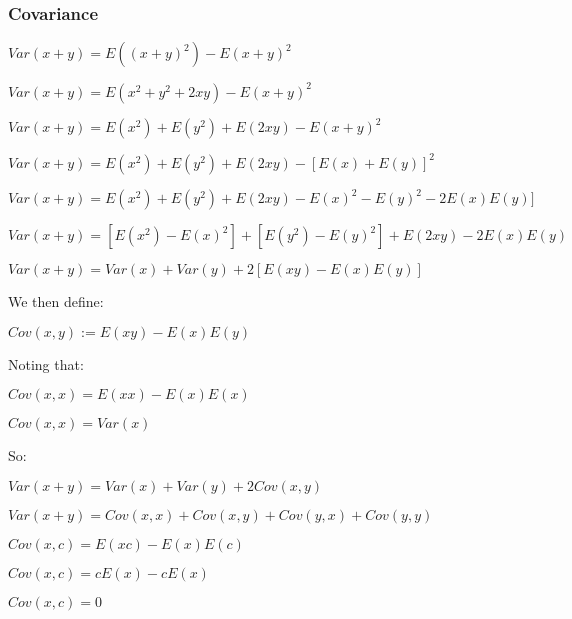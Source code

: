 \subsubsection{Covariance}

\(Var(x+y)=E((x+y)^2)-E(x+y)^2\)

\(Var(x+y)=E(x^2+y^2+2xy)-E(x+y)^2\)

\(Var(x+y)=E(x^2)+E(y^2)+E(2xy)-E(x+y)^2\)

\(Var(x+y)=E(x^2)+E(y^2)+E(2xy)-[E(x)+E(y)]^2\)

\(Var(x+y)=E(x^2)+E(y^2)+E(2xy)-E(x)^2-E(y)^2-2E(x)E(y)]\)

\(Var(x+y)=[E(x^2)-E(x)^2]+[E(y^2)-E(y)^2]+E(2xy)-2E(x)E(y)\)

\(Var(x+y)=Var(x) +Var(y)+2[E(xy)-E(x)E(y)]\)

We then define:

\(Cov(x,y):=E(xy)-E(x)E(y)\)

Noting that:

\(Cov(x,x)=E(xx)-E(x)E(x)\)

\(Cov(x,x)=Var(x) \)

So:

\(Var(x+y)=Var(x)+Var(y)+2Cov(x,y)\)

\(Var(x+y)=Cov(x,x)+Cov(x,y)+Cov(y,x)+Cov(y,y) \)

\(Cov(x,c)=E(xc)-E(x)E(c)\)

\(Cov(x,c)=cE(x)-cE(x)\)

\(Cov(x,c)=0\)

